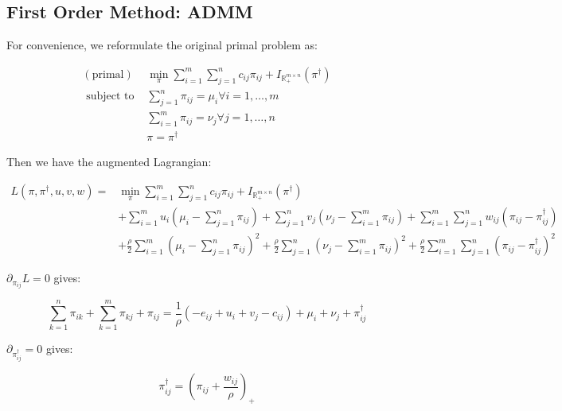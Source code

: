 \subsection{First Order Method: ADMM}
For convenience, we reformulate the original primal problem as:

\begin{equation}  
\begin{array}{rl}
{\mathrm{(primal)}} & {\min_\pi \sum_{i=1}^{m} \sum_{j=1}^{n} c_{i j} \pi_{i j} + I_{\mathbb{R}_+^{m\times n}}(\pi^\dagger)} \\
{\text { subject to }} & {\sum_{j=1}^{n} \pi_{i j}=\mu_{i} \forall i=1, \ldots, m} \\
{} & {\sum_{i=1}^{m} \pi_{i j}=\nu_{j} \forall j=1, \ldots, n} \\
& \pi = \pi^{\dagger}
\end{array}
\end{equation}

Then we have the augmented Lagrangian: 

\begin{equation}
  \begin{aligned}L(\pi, \pi^{\dagger}, u, v, w)=& \min_\pi \sum_{i=1}^{m} \sum_{j=1}^{n} c_{i j} \pi_{i j} + I_{\mathbb{R}_+^{m\times n}}(\pi^\dagger) \\&+\sum_{i=1}^{m} u_{i}\left(\mu_{i}-\sum_{j=1}^{n} \pi_{i j}\right)+\sum_{j=1}^{n} v_{j}\left(\nu_{j}-\sum_{i=1}^{m} \pi_{i j}\right)+\sum_{i=1}^{m} \sum_{j=1}^{n} w_{i j}\left(\pi_{i j}-\pi^{\dagger}_{i j}\right) \\&+\frac{\rho}{2} \sum_{i=1}^{m}\left(\mu_{i}-\sum_{j=1}^{n} \pi_{i j}\right)^{2}+\frac{\rho}{2} \sum_{j=1}^{n}\left(\nu_{j}-\sum_{i=1}^{m} \pi_{i j}\right)^{2}+\frac{\rho}{2} \sum_{i=1}^{m} \sum_{j=1}^{n}\left(\pi_{i j}-\pi^{\dagger}_{i j}\right)^{2}\end{aligned}
\end{equation}

$\partial_{\pi_{ij}} L = 0 $ gives: 

\begin{equation}
  \sum_{k=1}^{n} \pi_{i k}+\sum_{k=1}^{m} \pi_{k j}+\pi_{i j}=\frac{1}{\rho}\left(-e_{i j}+u_{i}+v_{j}-c_{i j}\right)+\mu_{i}+\nu_{j}+\pi_{ij}^{\dagger}
\end{equation}

$\partial_{\pi^{\dagger}_{ij}} = 0$ gives:

\begin{equation}
  {\pi^{\dagger}_{ij}} = (\pi_{ij} + \frac{w_{ij}}{\rho})_+
\end{equation}

